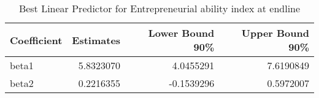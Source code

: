\begin{table}

\caption{\label{tab:QEntrep_total}Best Linear Predictor for Entrepreneurial ability index at endline}
\centering
\begin{tabular}[t]{lrrr}
\toprule
Coefficient & Estimates & Lower Bound 90\% & Upper Bound 90\%\\
\midrule
beta1 & 5.8323070 & 4.0455291 & 7.6190849\\
beta2 & 0.2216355 & -0.1539296 & 0.5972007\\
\bottomrule
\end{tabular}
\end{table}
